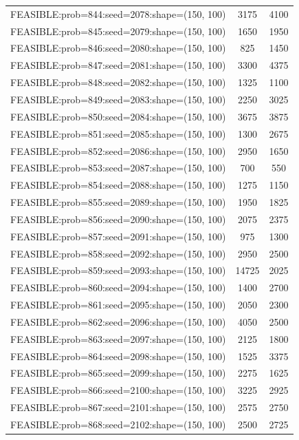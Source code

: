 \begin{longtable}{lcc}
FEASIBLE:prob=844:seed=2078:shape=(150, 100) &     3175 &  4100 \\
FEASIBLE:prob=845:seed=2079:shape=(150, 100) &     1650 &  1950 \\
FEASIBLE:prob=846:seed=2080:shape=(150, 100) &      825 &  1450 \\
FEASIBLE:prob=847:seed=2081:shape=(150, 100) &     3300 &  4375 \\
FEASIBLE:prob=848:seed=2082:shape=(150, 100) &     1325 &  1100 \\
FEASIBLE:prob=849:seed=2083:shape=(150, 100) &     2250 &  3025 \\
FEASIBLE:prob=850:seed=2084:shape=(150, 100) &     3675 &  3875 \\
FEASIBLE:prob=851:seed=2085:shape=(150, 100) &     1300 &  2675 \\
FEASIBLE:prob=852:seed=2086:shape=(150, 100) &     2950 &  1650 \\
FEASIBLE:prob=853:seed=2087:shape=(150, 100) &      700 &   550 \\
FEASIBLE:prob=854:seed=2088:shape=(150, 100) &     1275 &  1150 \\
FEASIBLE:prob=855:seed=2089:shape=(150, 100) &     1950 &  1825 \\
FEASIBLE:prob=856:seed=2090:shape=(150, 100) &     2075 &  2375 \\
FEASIBLE:prob=857:seed=2091:shape=(150, 100) &      975 &  1300 \\
FEASIBLE:prob=858:seed=2092:shape=(150, 100) &     2950 &  2500 \\
FEASIBLE:prob=859:seed=2093:shape=(150, 100) &    14725 &  2025 \\
FEASIBLE:prob=860:seed=2094:shape=(150, 100) &     1400 &  2700 \\
FEASIBLE:prob=861:seed=2095:shape=(150, 100) &     2050 &  2300 \\
FEASIBLE:prob=862:seed=2096:shape=(150, 100) &     4050 &  2500 \\
FEASIBLE:prob=863:seed=2097:shape=(150, 100) &     2125 &  1800 \\
FEASIBLE:prob=864:seed=2098:shape=(150, 100) &     1525 &  3375 \\
FEASIBLE:prob=865:seed=2099:shape=(150, 100) &     2275 &  1625 \\
FEASIBLE:prob=866:seed=2100:shape=(150, 100) &     3225 &  2925 \\
FEASIBLE:prob=867:seed=2101:shape=(150, 100) &     2575 &  2750 \\
FEASIBLE:prob=868:seed=2102:shape=(150, 100) &     2500 &  2725 \\

\end{longtable}
